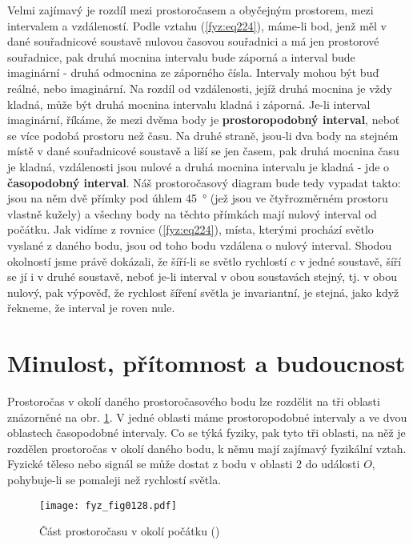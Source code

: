     Velmi zajímavý je rozdíl mezi prostoročasem a obyčejným prostorem, mezi intervalem a 
    vzdáleností. Podle vztahu (\ref{fyz:eq224}), máme-li bod, jenž měl v dané souřadnicové soustavě 
    nulovou časovou souřadnici a má jen prostorové souřadnice, pak druhá mocnina intervalu bude 
    záporná a interval bude imaginární - druhá odmocnina ze záporného čísla. Intervaly mohou být 
    buď reálné, nebo imaginární. Na rozdíl od vzdálenosti, jejíž druhá mocnina je vždy kladná, může 
    být druhá mocnina intervalu kladná i záporná. Je-li interval imaginární, říkáme, že mezi dvěma 
    body je \textbf{prostoropodobný interval}, neboť se více podobá prostoru než času. Na druhé 
    straně, jsou-li dva body na stejném místě v dané souřadnicové soustavě a liší se jen časem, pak 
    druhá mocnina času je kladná, vzdálenosti jsou nulové a druhá mocnina intervalu je kladná - jde 
    o \textbf{časopodobný interval}. Náš prostoročasový diagram bude tedy vypadat takto: jsou na 
    něm dvě přímky pod úhlem \SI{45}{\degree} (jež jsou ve čtyřrozměrném prostoru vlastně kužely) a 
    všechny body na těchto přímkách mají nulový interval od počátku. Jak vidíme z rovnice 
    (\ref{fyz:eq224}), místa, kterými prochází světlo vyslané z daného bodu, jsou od toho bodu 
    vzdálena o nulový interval. Shodou okolností jsme právě dokázali, že šíří-li se světlo 
    rychlostí \(c\) v jedné soustavě, šíří se jí i v druhé soustavě, neboť je-li interval v obou 
    soustavách stejný, tj. v obou nulový, pak výpověď, že rychlost šíření světla je invariantní, je 
    stejná, jako když řekneme, že interval je roven nule.
    
  \section{Minulost, přítomnost a budoucnost}\label{fyz:IchapXVIIsecIII}
    Prostoročas v okolí daného prostoročasového bodu lze rozdělit na tři oblasti znázorněné na obr. 
    \ref{fyz:fig0128}. V jedné oblasti máme prostoropodobné intervaly a ve dvou oblastech 
    časopodobné intervaly. Co se týká fyziky, pak tyto tři oblasti, na něž je rozdělen prostoročas 
    v okolí daného bodu, k němu mají zajímavý fyzikální vztah. Fyzické těleso nebo signál se může 
    dostat z bodu v oblasti \(2\) do události \(O\), pohybuje-li se pomaleji než rychlostí světla.

    \begin{figure}[ht!] %
      \centering
      \texttt{[image: fyz\_fig0128.pdf]}
      \caption{Část prostoročasu v okolí počátku
               (\cite[s.~241]{Feynman01})}
      \label{fyz:fig0128}
    \end{figure}
    
